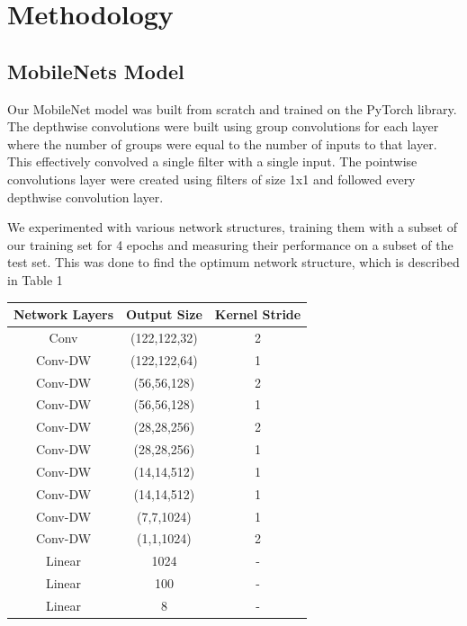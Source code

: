 \documentclass[10pt,twocolumn,letterpaper]{article}
\begin{document}

\section{Methodology}

\subsection{MobileNets Model}

Our MobileNet model was built from scratch and trained on the PyTorch library. The depthwise convolutions were built using group convolutions for each layer where the number of groups were equal to the number of inputs to that layer. This effectively convolved a single filter with a single input. The pointwise convolutions layer were created using filters of size 1x1 and followed every depthwise convolution layer.

We experimented with various network structures, training them with a subset of our training set for 4 epochs and measuring their performance on a subset of the test set. This was done to find the optimum network structure, which is described in Table 1





\begin{center}
\begin{tabular}{ |c|c|c| } 
 \hline
 Network Layers & Output Size & Kernel Stride \\ 
 \hline
 Conv & (122,122,32) & 2 \\
 \hline
 Conv-DW  & (122,122,64) & 1 \\ 
 \hline
 Conv-DW & (56,56,128) & 2 \\ 
 \hline
 Conv-DW & (56,56,128) & 1 \\ 
 \hline
 Conv-DW & (28,28,256) & 2 \\ 
 \hline
 Conv-DW & (28,28,256) & 1 \\ 
 \hline
 Conv-DW & (14,14,512) & 1 \\ 
 \hline
 Conv-DW & (14,14,512) & 1 \\ 
 \hline
 Conv-DW & (7,7,1024) & 1 \\ 
 \hline
 Conv-DW & (1,1,1024) & 2 \\ 
 \hline
 Linear & 1024 & - \\ 
 \hline
 Linear & 100 & - \\ 
 \hline
 Linear & 8 & - \\ 
 \hline
\end{tabular}
\end{center}
\end{document}
